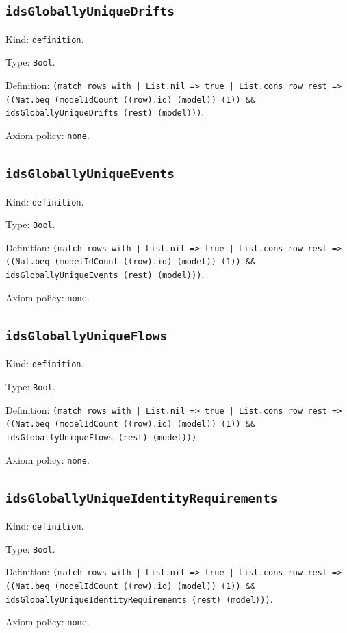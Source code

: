 \documentclass[11pt]{article}
\begin{document}
\subsection*{\texttt{idsGloballyUniqueDrifts}}
\noindent Kind: \texttt{definition}.\par
\noindent Type: \texttt{Bool}.\par
\noindent Definition: \texttt{(match rows with | List.nil => true | List.cons row rest => ((Nat.beq (modelIdCount ((row).id) (model)) (1)) \&\& idsGloballyUniqueDrifts (rest) (model)))}.\par
\noindent Axiom policy: \texttt{none}.\par
\subsection*{\texttt{idsGloballyUniqueEvents}}
\noindent Kind: \texttt{definition}.\par
\noindent Type: \texttt{Bool}.\par
\noindent Definition: \texttt{(match rows with | List.nil => true | List.cons row rest => ((Nat.beq (modelIdCount ((row).id) (model)) (1)) \&\& idsGloballyUniqueEvents (rest) (model)))}.\par
\noindent Axiom policy: \texttt{none}.\par
\subsection*{\texttt{idsGloballyUniqueFlows}}
\noindent Kind: \texttt{definition}.\par
\noindent Type: \texttt{Bool}.\par
\noindent Definition: \texttt{(match rows with | List.nil => true | List.cons row rest => ((Nat.beq (modelIdCount ((row).id) (model)) (1)) \&\& idsGloballyUniqueFlows (rest) (model)))}.\par
\noindent Axiom policy: \texttt{none}.\par
\subsection*{\texttt{idsGloballyUniqueIdentityRequirements}}
\noindent Kind: \texttt{definition}.\par
\noindent Type: \texttt{Bool}.\par
\noindent Definition: \texttt{(match rows with | List.nil => true | List.cons row rest => ((Nat.beq (modelIdCount ((row).id) (model)) (1)) \&\& idsGloballyUniqueIdentityRequirements (rest) (model)))}.\par
\noindent Axiom policy: \texttt{none}.\par
\end{document}
